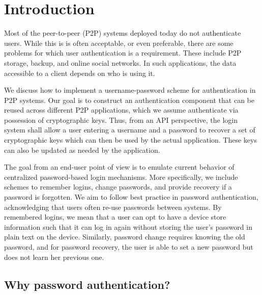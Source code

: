 \section{Introduction}

Most of the peer-to-peer (P2P) systems deployed today do not authenticate
users. While this is is often acceptable, or even preferable, there are some
problems for which user authentication is a requirement. These include P2P
storage, backup, and online social networks. In such applications, the data
accessible to a client depends on who is using it.

We discuss how to implement a username-password scheme for  authentication
in P2P systems. Our goal is to construct an authentication
component that can be reused across different P2P applications, which we assume 
authenticate via possession of cryptographic keys. Thus, from an API 
perspective, the login system shall allow a user entering a username and a password
to recover a set of cryptographic keys which can then be used by the actual
application. These keys can also be updated as needed
by the application.

The goal from an end-user point of view is to emulate current behavior 
of centralized password-based login mechanisms. More specifically,
we include schemes to remember logins, change passwords, and provide
recovery if a password is forgotten.  We aim to follow best practice in
password authentication, acknowledging that users often re-use passwords
between systems. By remembered logins, we mean that a user can opt to have
a device store information such that it can log in again without storing the
user's password in plain text on the device. 
Similarly, password change requires knowing the old password, and for
password recovery, the user is able to set a new password but does not learn
her previous one.


\subsection{Why password authentication?}

